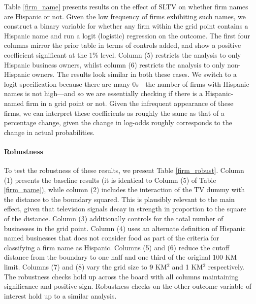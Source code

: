 \documentclass[11pt]{article}
\begin{document}
Table \ref{firm_name} presents results on the effect of SLTV on whether firm names are Hispanic or not. Given the low frequency of firms exhibiting such names, we construct a binary variable for whether any firm within the grid point contains a Hispanic name and run a logit (logistic) regression on the outcome. The first four columns mirror the prior table in terms of controls added, and show a positive coefficient significant at the 1\% level. Column (5) restricts the analysis to only Hispanic business owners, whilst column (6) restricts the analysis to only non-Hispanic owners. The results look similar in both these cases. We switch to a logit specification because there are many 0s---the number of firms with Hispanic names is not high---and so we are essentially checking if there is a Hispanic-named firm in a grid point or not. Given the infrequent appearance of these firms, we can interpret these coefficients as roughly the same as that of a percentage change, given the change in log-odds roughly corresponds to the change in actual probabilities.


\paragraph{Robustness} To test the robustness of these results, we present Table \ref{firm_robust}. Column (1) presents the baseline results (it is identical to Column (5) of Table \ref{firm_name}), while column (2) includes the interaction of the TV dummy with the distance to the boundary squared. This is plausibly relevant to the main effect, given that television signals decay in strength in proportion to the square of the distance. Column (3) additionally controls for the total number of businesses in the grid point. Column (4) uses an alternate definition of Hispanic named businesses that does not consider food as part of the criteria for classifying a firm name as Hispanic. Columns (5) and (6) reduce the cutoff distance from the boundary to one half and one third of the original 100 KM limit. Columns (7) and (8) vary the grid size to 9 KM$^2$ and 1 KM$^2$ respectively. The robustness checks hold up across the board with all columns maintaining significance and positive sign. Robustness checks on the other outcome variable of interest hold up to a similar analysis.
\end{document}
